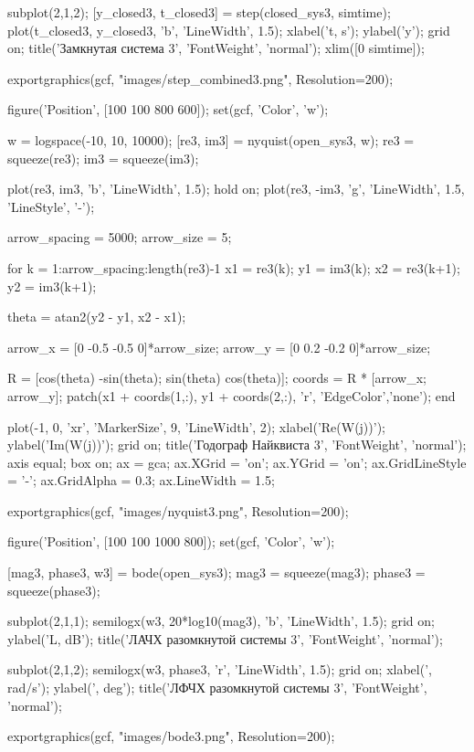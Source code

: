 \begin{matlabcode}
subplot(2,1,2);
[y_closed3, t_closed3] = step(closed_sys3, simtime);
plot(t_closed3, y_closed3, 'b', 'LineWidth', 1.5);
xlabel('t, s');
ylabel('y');
grid on;
title('Замкнутая система 3', 'FontWeight', 'normal');
xlim([0 simtime]);

exportgraphics(gcf, "images/step_combined3.png", Resolution=200);

figure('Position', [100 100 800 600]);
set(gcf, 'Color', 'w');

w = logspace(-10, 10, 10000);
[re3, im3] = nyquist(open_sys3, w);
re3 = squeeze(re3);
im3 = squeeze(im3);

plot(re3, im3, 'b', 'LineWidth', 1.5);
hold on;
plot(re3, -im3, 'g', 'LineWidth', 1.5, 'LineStyle', '-');

arrow_spacing = 5000;
arrow_size = 5;

for k = 1:arrow_spacing:length(re3)-1
    x1 = re3(k);
    y1 = im3(k);
    x2 = re3(k+1);
    y2 = im3(k+1);

    theta = atan2(y2 - y1, x2 - x1);

    arrow_x = [0 -0.5 -0.5 0]*arrow_size;
    arrow_y = [0 0.2 -0.2 0]*arrow_size;

    R = [cos(theta) -sin(theta); sin(theta) cos(theta)];
    coords = R * [arrow_x; arrow_y];
    patch(x1 + coords(1,:), y1 + coords(2,:), 'r', 'EdgeColor','none');
end

plot(-1, 0, 'xr', 'MarkerSize', 9, 'LineWidth', 2);
xlabel('Re(W(j\omega))');
ylabel('Im(W(j\omega))');
grid on;
title('Годограф Найквиста 3', 'FontWeight', 'normal');
axis equal;
box on;
ax = gca;
ax.XGrid = 'on';
ax.YGrid = 'on';
ax.GridLineStyle = '-';
ax.GridAlpha = 0.3;
ax.LineWidth = 1.5;

exportgraphics(gcf, "images/nyquist3.png", Resolution=200);

figure('Position', [100 100 1000 800]);
set(gcf, 'Color', 'w');

[mag3, phase3, w3] = bode(open_sys3);
mag3 = squeeze(mag3);
phase3 = squeeze(phase3);

subplot(2,1,1);
semilogx(w3, 20*log10(mag3), 'b', 'LineWidth', 1.5);
grid on;
ylabel('L, dB');
title('ЛАЧХ разомкнутой системы 3', 'FontWeight', 'normal');

subplot(2,1,2);
semilogx(w3, phase3, 'r', 'LineWidth', 1.5);
grid on;
xlabel('\omega, rad/s');
ylabel('\phi, deg');
title('ЛФЧХ разомкнутой системы 3', 'FontWeight', 'normal');

exportgraphics(gcf, "images/bode3.png", Resolution=200);
\end{matlabcode}

